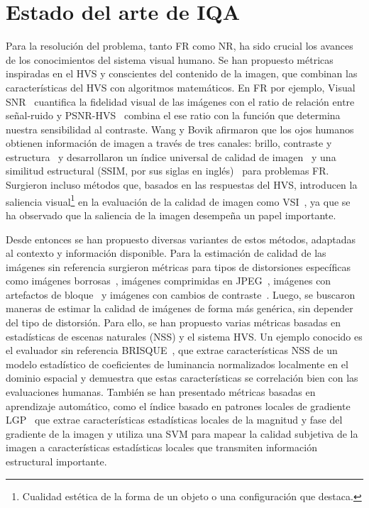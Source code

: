 \section{Estado del arte de IQA}
Para la resolución del problema, tanto FR como NR, ha sido crucial los avances de los conocimientos 
del sistema visual humano. Se han propuesto métricas inspiradas en el HVS y 
conscientes del contenido de la imagen, que combinan las características del HVS 
con algoritmos matemáticos. En FR por ejemplo, Visual SNR~\cite{VSNR} cuantifica 
la fidelidad visual de las imágenes con el ratio de relación entre señal-ruido y 
PSNR-HVS~\cite{PSNR-HVS} combina el ese ratio con la función que determina 
nuestra sensibilidad al contraste. 
Wang y Bovik afirmaron que los ojos humanos obtienen información de imagen a 
través de tres canales: brillo, contraste y estructura~\cite{SSIM} y desarrollaron 
un índice universal de calidad de imagen~\cite{UQI} y una similitud 
estructural (SSIM, por sus siglas en inglés)~\cite{SSIM} para problemas FR. Surgieron incluso métodos que, basados en las 
respuestas del HVS, introducen la saliencia visual\footnote{
  Cualidad estética de la forma de un objeto o una configuración que destaca.
} en la evaluación de la calidad de imagen como VSI~\cite{VSI}, 
ya que se ha observado que la saliencia de la imagen desempeña un papel importante.

Desde entonces se han propuesto diversas variantes de estos métodos, adaptadas 
al contexto y información disponible. 
Para la estimación de calidad de las imágenes sin referencia surgieron métricas para 
tipos de distorsiones específicas como 
imágenes borrosas~\cite{GradientBasedBlurAssessment}, 
imágenes comprimidas en JPEG~\cite{JPEGBasedOnLuminance}, 
imágenes con artefactos de bloque~\cite{DeblockedImages} y imágenes con 
cambios de contraste~\cite{ContrastDistorted}.
Luego, se buscaron maneras de estimar la calidad de imágenes de forma más genérica, 
sin depender del tipo de distorsión. Para ello, se han propuesto varias métricas 
basadas en estadísticas de escenas naturales (NSS) y el sistema HVS. 
Un ejemplo conocido es el evaluador sin referencia BRISQUE~\cite{BRISQUE}, que extrae 
características NSS de un modelo estadístico de coeficientes de luminancia 
normalizados localmente en el dominio espacial y demuestra que estas características 
se correlación bien con las evaluaciones humanas.
También se han presentado métricas basadas en aprendizaje automático, 
como el índice basado en patrones locales de gradiente LGP~\cite{LGP} que extrae 
características estadísticas locales de la magnitud y fase del gradiente de la imagen y utiliza una 
SVM para mapear la calidad subjetiva de la imagen a 
características estadísticas locales que transmiten información estructural importante.

